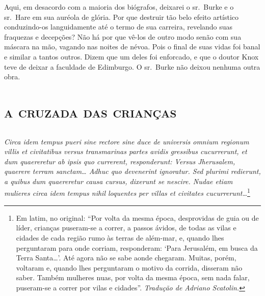 Aqui, em desacordo com a maioria dos biógrafos, deixarei o sr.~Burke e o
sr.~Hare em sua auréola de glória. Por que destruir tão belo efeito
artístico conduzindo-os languidamente até o termo de sua carreira,
revelando suas fraquezas e decepções? Não há por que vê-los de outro modo
senão com sua máscara na mão, vagando nas noites de névoa. Pois o final de
suas vidas foi banal e similar a tantos outros. Dizem que um deles foi
enforcado, e que o doutor Knox teve de deixar a faculdade de Edimburgo. O
sr.~Burke não deixou nenhuma outra obra.


\part{\textsc{a cruzada das crianças}}

\chapter*{}
\thispagestyle{empty}
{\itshape
Circa idem tempus pueri sine rectore sine duce de universis omnium regionum villis et civitatibus 
versus transmarinas partes avidis gressibus cucurrerunt, et dum quaereretur ab ipsis quo currerent, 
responderunt: Versus Jherusalem, quaerere terram sanctam\ldots{} Adhuc quo devenerint ignoratur. 
Sed plurimi redierunt, a quibus dum quaereretur causa cursus, dixerunt se nescire. Nudae etiam mulieres 
circa idem tempus nihil loquentes per villas et civitates cucurrerunt\ldots{}}\footnote{ Em latim, no original: ``Por volta da mesma época, 
desprovidas de guia ou de líder,  crianças puseram-se a correr, a passos ávidos, de todas as vilas e cidades de cada região rumo às terras 
de além-mar, e, quando lhes perguntaram para onde corriam, responderam: ‘Para Jerusalém, em busca da Terra Santa\ldots{}’. 
Até agora não se sabe aonde chegaram. Muitas, porém, voltaram e, quando lhes perguntaram o motivo da corrida, disseram não saber. 
Também mulheres nuas, por volta da mesma época, sem nada falar, puseram-se a correr por vilas e cidades''. \textit{Tradução de Adriano Scatolin.}}


